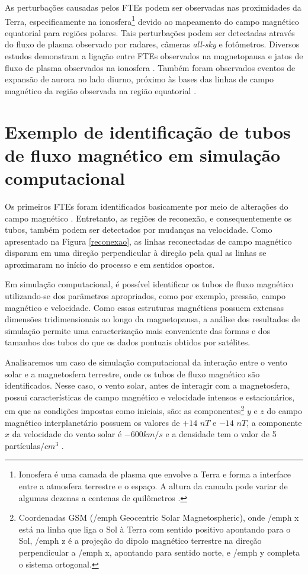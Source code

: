 As perturbações causadas pelos FTEs podem ser observadas nas proximidades da Terra, especificamente na ionosfera\footnote{Ionosfera é uma camada de plasma que envolve a Terra e forma a interface entre a atmosfera terrestre e o espaço. A altura da camada pode variar de algumas dezenas a centenas de quilômetros \cite{kelley}.} devido ao mapeamento do campo magnético equatorial para regiões polares. Tais perturbações podem ser detectadas através do fluxo de plasma observado por radares, câmeras \textit{all-sky} e fotômetros. Diversos estudos demonstram a ligação entre FTEs observados na magnetopausa e jatos de fluxo de plasma observados na ionosfera \cite{Fearetal2009,pinnock03,gary90}. Também foram observados eventos de expansão de aurora no lado diurno, próximo às bases das linhas de campo magnético da região observada na região equatorial \cite{Elphicetal1990,GlassmeierandStellMacher1996,Neudeggetal2000}. 


\section {Exemplo de identificação de tubos de fluxo magnético em simulação computacional}

Os primeiros FTEs foram identificados basicamente por meio de alterações do campo magnético \cite{elphic1978}. Entretanto, as regiões de reconexão, e consequentemente os tubos, também podem ser detectados por mudanças na velocidade. Como apresentado na Figura \ref{reconexao}, as linhas reconectadas de campo magnético disparam em uma direção perpendicular à direção pela qual as linhas se aproximaram no início do processo e em sentidos opostos. 

Em simulação computacional, é possível identificar os tubos de fluxo magnético utilizando-se dos parâmetros apropriados, como por exemplo, pressão, campo magnético e velocidade. Como essas estruturas magnéticas possuem extensas dimensões tridimensionais ao longo da magnetopausa, a análise dos resultados de simulação permite uma caracterização mais conveniente das formas e dos tamanhos dos tubos do que os dados pontuais obtidos por satélites. 

Analisaremos um caso de simulação computacional da interação entre o vento solar e a magnetosfera terrestre, onde os tubos de fluxo magnético são identificados. Nesse caso, o vento solar, antes de interagir com a magnetosfera, possui características de campo magnético e velocidade intensos e estacionários, em que as condições impostas como iniciais, são: as componentes\footnote{Coordenadas GSM ({/emph Geocentric Solar Magnetospheric}), onde {/emph x} está na linha que liga o Sol à Terra com sentido positivo apontando para o Sol, {/emph z} é a projeção do dipolo magnético terrestre na direção perpendicular a {/emph x}, apontando para sentido norte, e {/emph y} completa o sistema ortogonal.} $y$ e $z$ do campo magnético interplanetário possuem os valores de $+14$ $nT$ e $-14$ $nT$, a componente $x$ da velocidade do vento solar é $- 600 km/s$ e a densidade tem o valor de 5 partículas$/cm^3$ \cite{cardoso2013}.

